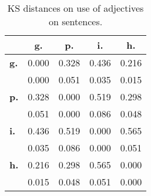 \begin{table}[h!]
\begin{center}
\begin{tabular}{| l || c | c | c | c |}\hline
 & {\bf g.} & {\bf p.} & {\bf i.} & {\bf h.} \\\hline\hline
{\bf g.} & 0.000 & 0.328 & 0.436 & 0.216 \\
{\bf } & 0.000 & 0.051 & 0.035 & 0.015 \\\hline
{\bf p.} & 0.328 & 0.000 & 0.519 & 0.298 \\
{\bf } & 0.051 & 0.000 & 0.086 & 0.048 \\\hline
{\bf i.} & 0.436 & 0.519 & 0.000 & 0.565 \\
{\bf } & 0.035 & 0.086 & 0.000 & 0.051 \\\hline
{\bf h.} & 0.216 & 0.298 & 0.565 & 0.000 \\
{\bf } & 0.015 & 0.048 & 0.051 & 0.000 \\\hline
\end{tabular}
\caption{KS distances on use of adjectives on sentences.}
\end{center}
\end{table}